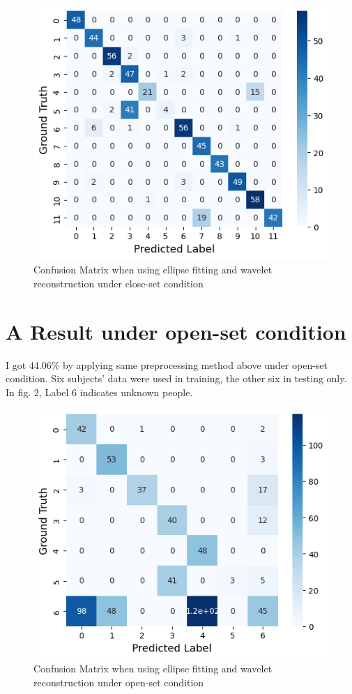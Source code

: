 \documentclass[dvipdfmx]{article}
\begin{document}
\begin{figure}[H]
\begin{center}
\includegraphics[width=0.6\linewidth]{./img/el_wav.png}
\end{center}
\caption{Confusion Matrix when using ellipse fitting and wavelet reconstruction under close-set condition}
\end{figure}

\section{A Result under open-set condition}
I got 44.06\% by applying same preprocessing method above under open-set condition. Six subjects' data were used in training, the other six in testing only. In fig. 2, Label 6 indicates unknown people.

\begin{figure}[H]
\begin{center}
\includegraphics[width=0.6\linewidth]{./img/el_wav_open.png}
\end{center}
\caption{Confusion Matrix when using ellipse fitting and wavelet reconstruction under open-set condition}
\end{figure}
\end{document}
